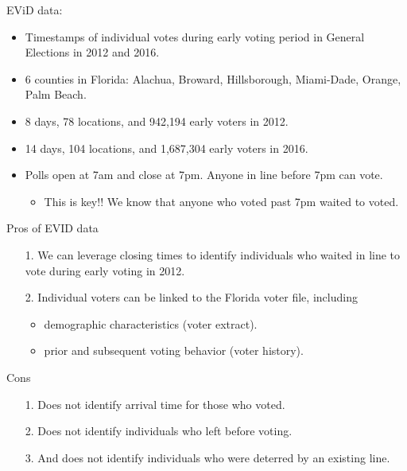 \documentclass{beamer}
\begin{document}
		\begin{frame}
		EViD data:
			\begin{itemize}
				\item<2->Timestamps of individual votes during early voting period in General Elections in 2012 and 2016.
				\item<2->6 counties in Florida: Alachua, Broward, Hillsborough,  Miami-Dade, Orange, Palm Beach.
				\item<2->8 days, 78 locations, and 942,194 early voters in 2012.
				\item<2->14 days, 104 locations, and 1,687,304 early voters in 2016.
			\end{itemize}
			\begin{itemize}
				\item<3->[] Polls open at 7am and close at 7pm.  Anyone in line before 7pm can vote.
				\begin{itemize}
					\item This is key!! We know
                                          that anyone who voted past
                                          7pm waited to voted.
				\end{itemize} 
			\end{itemize} 
		\end{frame}
			
		\begin{frame}
		Pros of EVID data
			\begin{itemize}
				\item[1.]  We can leverage closing times to identify individuals who waited in line to vote during early voting in 2012. 
				\item[2.]  Individual voters can be linked to the Florida voter file, including
                                  \begin{itemize}
                                  \item  demographic characteristics (voter extract). 
                                  \item  prior and subsequent voting behavior (voter history). 
                                  \end{itemize}
                                \end{itemize}
		Cons
			\begin{itemize}
				\item[1.] Does not identify arrival time for those who voted.
				\item[2.] Does not identify
                                  individuals who left before voting.
				\item[3.] And does not identify
                                  individuals who were deterred by an
                                  existing line.
			\end{itemize}
		\end{frame}
		
\end{document}
